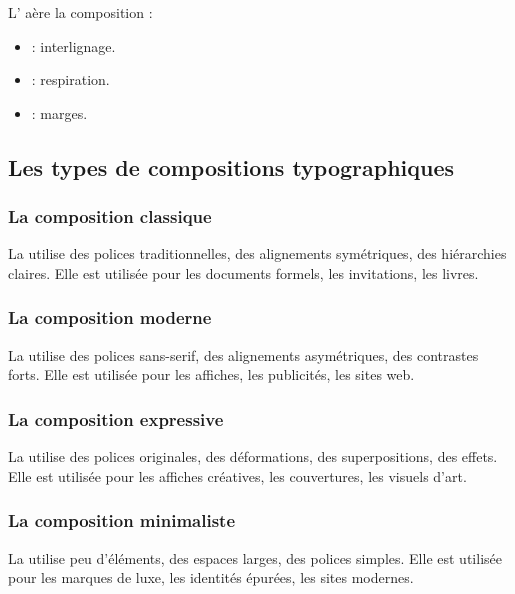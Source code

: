 L' aère la composition :

\begin{itemize}
    \item {} : interlignage.
    \item {} : respiration.
    \item {} : marges.
\end{itemize}

\subsection{Les types de compositions typographiques}

\subsubsection{La composition classique}

La  utilise des polices traditionnelles, des alignements symétriques, des hiérarchies claires. Elle est utilisée pour les documents formels, les invitations, les livres.

\subsubsection{La composition moderne}

La  utilise des polices sans-serif, des alignements asymétriques, des contrastes forts. Elle est utilisée pour les affiches, les publicités, les sites web.

\subsubsection{La composition expressive}

La  utilise des polices originales, des déformations, des superpositions, des effets. Elle est utilisée pour les affiches créatives, les couvertures, les visuels d'art.

\subsubsection{La composition minimaliste}

La  utilise peu d'éléments, des espaces larges, des polices simples. Elle est utilisée pour les marques de luxe, les identités épurées, les sites modernes.

